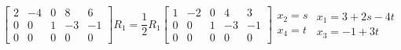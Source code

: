 \begin{example}
\[\begin{bmatrix}
    2 & -4 & 0 & 8 & 6\\
    0 & 0 & 1 & -3 & -1\\
    0 & 0 & 0 & 0 & 0
    \end{bmatrix}
    R_1 = \frac{1}{2}R_1
    \begin{bmatrix}
    1 & -2 & 0 & 4 & 3\\
    0 & 0 & 1 & -3 & -1\\
    0 & 0 & 0 & 0 & 0
    \end{bmatrix}
    \begin{array}{l}
    x_2 = s\\
    x_4 = t
    \end{array}
    \begin{array}{l}
    x_1 = 3 + 2s - 4t\\
    x_3 = -1 + 3t
    \end{array}
\]
\end{example}